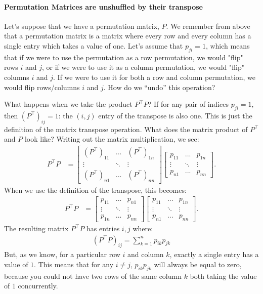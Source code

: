 \paragraph*{Permutation Matrices are unshuffled by their transpose}

Let's suppose that we have a permutation matrix, $P$. We remember from above that a permutation matrix is a matrix where every row and every column has a single entry which takes a value of one. Let's assume that $p_{ji} = 1$, which means that if we were to use the permutation as a row permutation, we would "flip" rows $i$ and $j$, or if we were to use it as a column permutation, we would "flip" columns $i$ and $j$. If we were to use it for both a row and column permutation, we would flip rows/columns $i$ and $j$. How do we ``undo'' this operation?

What happens when we take the product $P^\top P$? If for any pair of indices $p_{ji} = 1$, then $(P^\top)_{ij}=1$: the $(i, j)$ entry of the transpose is also one. This is just the definition of the matrix transpose operation. What does the matrix product of $P^\top$ and $P$ look like? Writing out the matrix multiplication, we see:
\begin{align*}
    P^\top P &= \begin{bmatrix}
    (P^\top)_{11} & ... & (P^\top)_{1n} \\
    \vdots & \ddots & \vdots \\
    (P^\top)_{n1} & ... & (P^\top)_{nn}
    \end{bmatrix}\begin{bmatrix}
    p_{11} & ... & p_{1n} \\
    \vdots & \ddots & \vdots \\
    p_{n1} & ... & p_{nn}
    \end{bmatrix}.
\end{align*}
When we use the definition of the transpose, this becomes:
\begin{align*}    P^\top P &= \begin{bmatrix}
    p_{11}& ... & p_{n1}\\
    \vdots & \ddots & \vdots \\
    p_{1n} & ... & p_{nn}
    \end{bmatrix}\begin{bmatrix}
    p_{11} & ... & p_{1n} \\
    \vdots & \ddots & \vdots \\
    p_{n1} & ... & p_{nn}
    \end{bmatrix}.
\end{align*}
The resulting matrix $P^\top P$ has entries $i, j$ where:
\begin{align*}
(P^\top P)_{ij} = \sum_{k = 1}^n p_{ik}p_{jk}
\end{align*}
But, as we know, for a particular row $i$ and column $k$, exactly a single entry has a value of $1$. This means that for any $i \neq j$,  $p_{ik}p_{jk}$ will always be equal to zero, because you could not have two rows of the same column $k$ both taking the value of $1$ concurrently.

